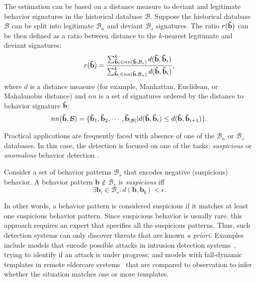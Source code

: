  The estimation can be based on a distance measure to deviant and legitimate behavior signatures in the historical database $\mathcal{B}$. Suppose the historical database $\mathcal{B}$ can be split into legitimate $\mathcal{B}_n$ and deviant $\mathcal{B}_s$ signatures. The ratio $r(\mathbf{\tilde{b}})$ can be then defined as a ratio between distance to the $k$-nearest legitimate and deviant signatures:
\begin{equation}
		r(\mathbf{\tilde{b}}) = \frac{\sum_{\mathbf{\tilde{b}}_i \in nn(\mathbf{\tilde{b}}, \mathcal{B}_s)}^k d(\mathbf{\tilde{b}}, \mathbf{\tilde{b}}_i)}{\sum_{\mathbf{\tilde{b}}_i \in nn(\mathbf{\tilde{b}}, \mathcal{B}_n)}^k d(\mathbf{\tilde{b}}, \mathbf{\tilde{b}}_i)},
\label{eq:density-r}
\end{equation}
\noindent
where $d$ is a distance measure (for example, Manhattan, Euclidean, or Mahalanobis distance) and $nn$ is a set of signatures ordered by the distance to behavior signature $\mathbf{\tilde{b}}$:
\begin{equation}
		nn(\mathbf{\tilde{b}}, \mathcal{B})=\{\mathbf{\tilde{b}}_1, \mathbf{\tilde{b}}_2, \cdots, \mathbf{\tilde{b}}_{|\mathcal{B}|}| d(\mathbf{\tilde{b}}, \mathbf{\tilde{b}}_i) \leq d(\mathbf{\tilde{b}}, \mathbf{\tilde{b}}_{i+1})\}.
\label{eq:density-nn}
\end{equation}

Practical applications are frequently faced with absence of one of the $\mathcal{B}_n$ or $\mathcal{B}_s$ databases. In this case, the detection is focused on one of the tasks: \emph{suspicious} or \emph{anomalous} behavior detection \citep{Avrahami-Zilberbrand2009}.


\begin{definition}
	Consider a set of behavior patterns $\mathcal{B}_s$ that encodes negative (suspicious) behavior. A behavior pattern $\mathbf{b} \not \in \mathcal{B}_s$ is \emph{suspicious} iff
	$$
	\exists \mathbf{b}_i \in \mathcal{B}_s: d(\mathbf{b}, \mathbf{b_i}) < \epsilon.
	$$
\end{definition}
\noindent
In other words, a behavior pattern is considered suspicious if it matches at least one suspicious behavior pattern. 
Since suspicious behavior is usually rare, this approach requires an expert that specifies all the suspicious patterns. Thus, such detection systems can only discover threats that are known {\it a priori}. 
Examples include models that encode possible attacks in intrusion detection systems~\citep{Biermann2001}, trying to identify if an attack is under progress; and models with fall-dynamic templates in remote eldercare systems~\citep{Lee04daily} that are compared to observation to infer whether the situation matches one or more templates.


